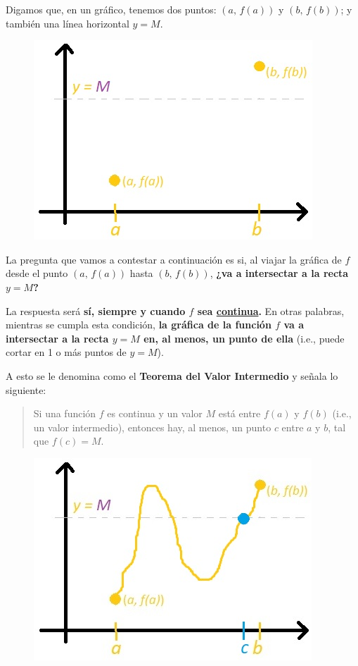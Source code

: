 \documentclass[12pt]{article}
\begin{document}
Digamos que, en un gráfico, tenemos dos puntos: $(a, \, f(a))$ y $(b, \, f(b))$; y también una línea horizontal $y = M$.

\begin{figure}[hbt!]
\centering
\includegraphics[scale=0.7]{img/intermed_value_teo.jpg}
\end{figure}

La pregunta que vamos a contestar a continuación es si, al viajar la gráfica de $f$ desde el punto $(a, \, f(a))$ hasta $(b, \, f(b))$, \textbf{¿va a intersectar a la recta $y = M$?}

La respuesta será \textbf{sí, siempre y cuando $f$ sea \underline{continua}.} En otras palabras, mientras se cumpla esta condición, \textbf{la gráfica de la función $f$ va a intersectar a la recta $y = M$ en, al menos, un punto de ella} (i.e., puede cortar en 1 o más puntos de $y = M$).

A esto se le denomina como el \textbf{Teorema del Valor Intermedio} y señala lo siguiente:
\begin{quotation}
Si una función $f$ es continua y un valor $M$ está entre $f(a)$ y $f(b)$ (i.e., un valor intermedio), entonces hay, al menos, un punto $c$ entre $a$ y $b$, tal que $f(c) = M$.
\end{quotation}

\begin{figure}[hbt!]
\centering
\includegraphics[scale=0.7]{img/intermed_value_teo_2.jpg}
\end{figure}
\end{document}
